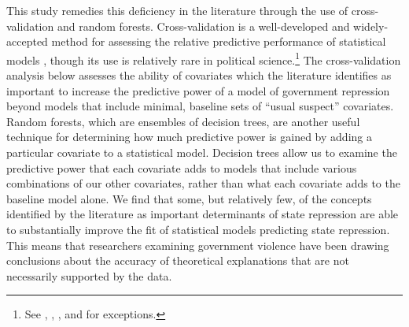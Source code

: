 \documentclass[12pt]{article}
\begin{document}
This study remedies this deficiency in the literature through the use of cross-validation and random forests. Cross-validation is a well-developed and widely-accepted method for assessing the relative predictive performance of statistical models \citep[See, e.g.,][]{Geisser1975, Efron1983, PicardCook1984, HastieTibshiraniFriedman2008}, though its use is relatively rare in political science.\footnote{See \citet{HoffWard2004}, \citet{WardHoff2007}, \citet{WardSiversonCao2007}, and \citet{Wardetal2010} for exceptions.} The cross-validation analysis below assesses the ability of covariates which the literature identifies as important to increase the predictive power of a model of government repression beyond models that include minimal, baseline sets of ``usual suspect'' covariates. Random forests, which are ensembles of decision trees, are another useful technique for determining how much predictive power is gained by adding a particular covariate to a statistical model. Decision trees allow us to examine the predictive power that each covariate adds to models that include various combinations of our other covariates, rather than what each covariate adds to the baseline model alone. We find that some, but relatively few, of the concepts identified by the literature as important determinants of state repression are able to substantially improve the fit of statistical models predicting state repression. This means that researchers examining government violence have been drawing conclusions about the accuracy of theoretical explanations that are not necessarily supported by the data. 
\end{document}
